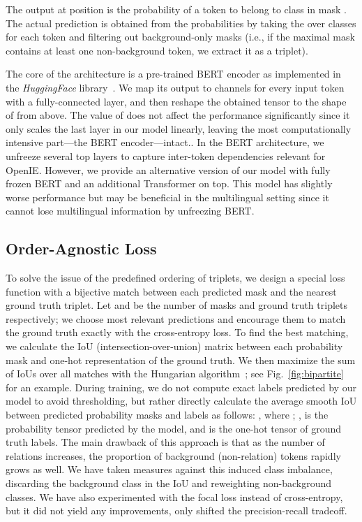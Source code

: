 \documentclass[letterpaper]{article} \usepackage{aaai22}  \usepackage{times}  \usepackage{helvet}  \usepackage{courier}  \usepackage[hyphens]{url}  \usepackage{graphicx} \usepackage{placeins}
\begin{document}
The output at position  is the probability of a token  to belong to class  in mask . The actual prediction is obtained from the probabilities by taking the  over classes for each token and filtering out background-only masks (i.e., if the maximal mask contains at least one non-background token, we extract it as a triplet). 


The core of the architecture is a pre-trained BERT encoder as implemented in the \emph{HuggingFace} library~\cite{devlin-etal-2019-bert,wolf-etal-2020-transformers}.
We map its output to  channels for every input token with a fully-connected layer, and then reshape the obtained tensor to the shape of  from above.
The value of  does not affect the performance significantly since it only scales the last layer in our model linearly, leaving the most computationally intensive part---the BERT encoder---intact..
In the BERT architecture, we unfreeze several top layers to capture inter-token dependencies relevant for OpenIE. However, we provide an alternative version of our model with fully frozen BERT and an additional Transformer on top. This model has slightly worse performance but may be beneficial in the multilingual setting since it cannot lose multilingual information by unfreezing BERT.

\subsection{Order-Agnostic Loss}

To solve the issue of the predefined ordering of triplets, we design a special loss function with a bijective match between each predicted mask and the nearest ground truth triplet. Let  and  be the number of masks and ground truth triplets respectively; we choose  most relevant predictions and encourage them to match the ground truth exactly with the cross-entropy loss. To find the best matching, we calculate the  IoU (intersection-over-union) matrix between each probability mask and one-hot representation of the ground truth. We then maximize 
the sum of IoUs over all matches with the Hungarian algorithm~\cite{kuhn1955hungarian}; see Fig.~\ref{fig:bipartite} for an example.
During training, we do not compute exact labels predicted by our model to avoid thresholding, but rather directly calculate the average smooth IoU between predicted probability masks and labels as follows:
, where
    ;
    ,
 is the probability tensor predicted by the model, and  is the one-hot tensor of ground truth labels.
The main drawback of this approach is that as the number of relations increases, the proportion of background (non-relation) tokens rapidly grows as well. We have taken measures against this induced class imbalance, discarding the background class in the IoU and reweighting non-background classes. We have also experimented with the focal loss instead of cross-entropy, but it did not yield any improvements, only shifted the precision-recall tradeoff.
\end{document}

